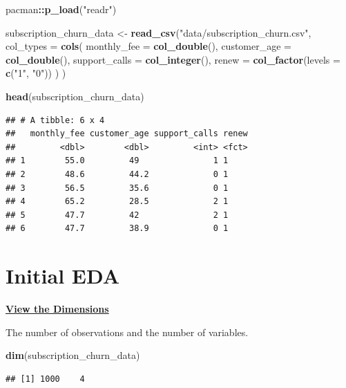 \documentclass[
]{article}
\newenvironment{Shaded}{\begin{snugshade}}{\end{snugshade}}
\newcommand{\AttributeTok}[1]{\textcolor[rgb]{0.13,0.29,0.53}{#1}}
\newcommand{\FunctionTok}[1]{\textcolor[rgb]{0.13,0.29,0.53}{\textbf{#1}}}
\newcommand{\NormalTok}[1]{#1}
\newcommand{\OtherTok}[1]{\textcolor[rgb]{0.56,0.35,0.01}{#1}}
\newcommand{\SpecialCharTok}[1]{\textcolor[rgb]{0.81,0.36,0.00}{\textbf{#1}}}
\newcommand{\StringTok}[1]{\textcolor[rgb]{0.31,0.60,0.02}{#1}}
\begin{document}
\begin{Shaded}
\begin{Highlighting}[]
\NormalTok{pacman}\SpecialCharTok{::}\FunctionTok{p\_load}\NormalTok{(}\StringTok{"readr"}\NormalTok{)}

\NormalTok{subscription\_churn\_data }\OtherTok{\textless{}{-}} 
  \FunctionTok{read\_csv}\NormalTok{(}\StringTok{"data/subscription\_churn.csv"}\NormalTok{, }\AttributeTok{col\_types =} \FunctionTok{cols}\NormalTok{(}
    \AttributeTok{monthly\_fee =} \FunctionTok{col\_double}\NormalTok{(),}
    \AttributeTok{customer\_age =} \FunctionTok{col\_double}\NormalTok{(),}
    \AttributeTok{support\_calls =} \FunctionTok{col\_integer}\NormalTok{(),}
    \AttributeTok{renew =} \FunctionTok{col\_factor}\NormalTok{(}\AttributeTok{levels =} \FunctionTok{c}\NormalTok{(}\StringTok{"1"}\NormalTok{, }\StringTok{"0"}\NormalTok{))}
\NormalTok{    )}
\NormalTok{  )}

\FunctionTok{head}\NormalTok{(subscription\_churn\_data)}
\end{Highlighting}
\end{Shaded}

\begin{verbatim}
## # A tibble: 6 x 4
##   monthly_fee customer_age support_calls renew
##         <dbl>        <dbl>         <int> <fct>
## 1        55.0         49               1 1    
## 2        48.6         44.2             0 1    
## 3        56.5         35.6             0 1    
## 4        65.2         28.5             2 1    
## 5        47.7         42               2 1    
## 6        47.7         38.9             0 1
\end{verbatim}

\section{Initial EDA}\label{initial-eda}

\ul{\textbf{View the Dimensions}}

The number of observations and the number of variables.

\begin{Shaded}
\begin{Highlighting}[]
\FunctionTok{dim}\NormalTok{(subscription\_churn\_data)}
\end{Highlighting}
\end{Shaded}

\begin{verbatim}
## [1] 1000    4
\end{verbatim}
\end{document}

